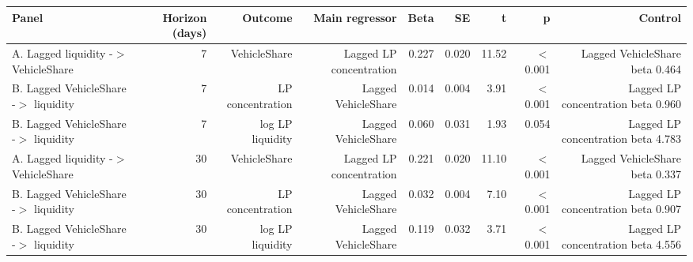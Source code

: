 \begin{tabular}{lrrrrrrrr}
\toprule
Panel & Horizon (days) & Outcome & Main regressor & Beta & SE & t & p & Control \\
\midrule
A. Lagged liquidity -\ensuremath{>} VehicleShare & 7 & VehicleShare & Lagged LP concentration & 0.227 & 0.020 & 11.52 & \ensuremath{<}0.001 & Lagged VehicleShare beta 0.464 \\
B. Lagged VehicleShare -\ensuremath{>} liquidity & 7 & LP concentration & Lagged VehicleShare & 0.014 & 0.004 & 3.91 & \ensuremath{<}0.001 & Lagged LP concentration beta 0.960 \\
B. Lagged VehicleShare -\ensuremath{>} liquidity & 7 & log LP liquidity & Lagged VehicleShare & 0.060 & 0.031 & 1.93 & 0.054 & Lagged LP concentration beta 4.783 \\
A. Lagged liquidity -\ensuremath{>} VehicleShare & 30 & VehicleShare & Lagged LP concentration & 0.221 & 0.020 & 11.10 & \ensuremath{<}0.001 & Lagged VehicleShare beta 0.337 \\
B. Lagged VehicleShare -\ensuremath{>} liquidity & 30 & LP concentration & Lagged VehicleShare & 0.032 & 0.004 & 7.10 & \ensuremath{<}0.001 & Lagged LP concentration beta 0.907 \\
B. Lagged VehicleShare -\ensuremath{>} liquidity & 30 & log LP liquidity & Lagged VehicleShare & 0.119 & 0.032 & 3.71 & \ensuremath{<}0.001 & Lagged LP concentration beta 4.556 \\
\bottomrule
\end{tabular}
